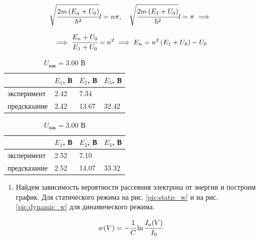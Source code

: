 \documentclass[a4paper,12pt]{article}
\begin{document}
\begin{equation*}
    \sqrt{\cfrac{2m \left( E_n + U_0 \right)}{\hbar^2}} l = n \pi, \ \ \  \sqrt{\cfrac{2m \left( E_1 + U_0 \right)}{\hbar^2}} l = \pi \implies
\end{equation*}

\begin{equation*}
    \implies \cfrac{E_n + U_0}{E_1 + U_0} = n^2 \implies E_n = n^2 \left(E_1 + U_0\right) - U_0
\end{equation*}


\begin{table}[!h]
    \centering
    \begin{minipage}{0.48\textwidth}
        \centering
        \begin{tabular}{l|lll}
            \hline
            ~            & $E_1$, В & $E_2$, В & $E_3$, В \\ \hline
            эксперимент  & 2.42     & 7.34     & ~        \\
            предсказание & 2.42     & 13.67    & 32.42    \\ \hline
        \end{tabular}
        \caption{$U_{\text{нак}} = 2.85$ В}
    \end{minipage}
    \hfill
    \begin{minipage}{0.48\textwidth}
        \centering
        \begin{tabular}{l|lll}
            \hline
            ~            & $E_1$, В & $E_2$, В & $E_3$, В \\ \hline
            эксперимент  & 2.52     & 7.10     & ~        \\
            предсказание & 2.52     & 14.07    & 33.32    \\ \hline
        \end{tabular}
        \caption{$U_{\text{нак}} = 3.00$ В}
    \end{minipage}
    \label{table:grad}
\end{table}

\begin{enumerate}[resume]
    \item Найдем зависимость вероятности рассеяния электрона от энергии и построим график. Для статического режима на рис. \ref{pic:static_w} и на рис. \ref{pic:dynamic_w} для динамического режима.
\end{enumerate}

\begin{equation*}
    w(V) = - \cfrac{1}{C} \ln {\cfrac{I_a(V)}{I_0}}
\end{equation*}
\end{document}
